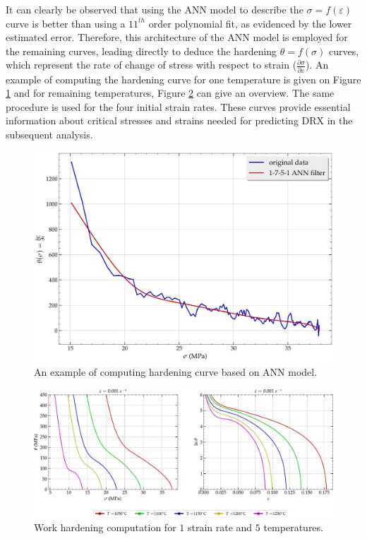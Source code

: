 \documentclass[metals,article,submit,pdftex,moreauthors]{Definitions/mdpi}
\begin{document}
It can clearly be observed that using the ANN model to describe the $\sigma=f(\varepsilon)$ curve is better than using a $11^{th}$ order polynomial fit, as evidenced by the lower estimated error. Therefore, this architecture of the ANN model is employed for the remaining curves, leading directly to deduce the hardening $\theta=f(\sigma)$ curves, which represent the rate of change of stress with respect to strain ($\frac{\partial \sigma}{\partial \varepsilon}$). An example of computing the hardening curve for one temperature is given on Figure \ref{fig:AnnTheta} and for remaining temperatures, Figure \ref{fig:nThetaOP} can give an overview. The same procedure is used for the four initial strain rates. These curves provide essential information about critical stresses and strains needed for predicting DRX in the subsequent analysis.

\begin{figure}[H]
\includegraphics[width=0.7\columnwidth]{Figures/AnnTheta}
\caption{An example of computing hardening curve based on ANN model.}
\label{fig:AnnTheta}
\end{figure}

\begin{figure}[H]
\includegraphics[width=0.99\columnwidth]{Figures/nThetaOP}
\caption{Work hardening computation for $1$ strain rate and $5$ temperatures.}
\label{fig:nThetaOP}
\end{figure}
\end{document}
